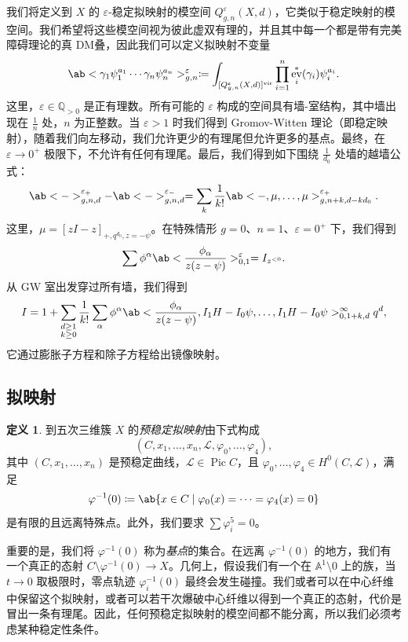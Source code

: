 \documentclass{amsart}
\theoremstyle{definition}
\newtheorem{defn}[thm]{定义}
\theoremstyle{remark}
\theoremstyle{plain}
\theoremstyle{definition}
\theoremstyle{remark}
\newcommand{\A}{\mathbb{A}}
\newcommand{\Q}{\mathbb{Q}}
\newcommand{\ep}{\varepsilon}
\newcommand{\mc}[1]{\mathcal{#1}}
\newcommand{\mr}[1]{\mathrm{#1}}
\newcommand{\1}{\mathbf{1}}
\newcommand{\2}{\mathbf{2}}
\newcommand{\3}{\mathbf{3}}
\newcommand{\vir}{\mr{vir}}
\DeclareMathOperator{\Pic}{Pic}
\DeclareMathOperator{\ev}{ev}
\begin{document}
我们将定义到 \(X\) 的 \(\ep\)-稳定拟映射的模空间 \(Q_{g,n}^{\ep}(X, d)\)，它类似于稳定映射的模空间。我们希望将这些模空间视为彼此虚双有理的，并且其中每一个都是带有完美障碍理论的真 DM叠，因此我们可以定义拟映射不变量
\[ \ab< \gamma_1 \psi_1^{a_1} \cdots \gamma_n \psi_n^{a_n}>_{g,n}^{\ep} \coloneqq \int_{[Q_{g,n}^{\ep}(X,d)]^{\vir}} \prod_{i=1}^n \ev_i^*(\gamma_i) \psi_i^{a_i}. \]
这里，\(\ep \in \Q_{>0}\) 是正有理数。所有可能的 \(\ep\) 构成的空间具有墙-室结构，其中墙出现在 \(\frac{1}{n}\) 处，\(n\) 为正整数。当 \(\ep > 1\) 时我们得到 Gromov-Witten 理论（即稳定映射），随着我们向左移动，我们允许更少的有理尾但允许更多的基点。最终，在 \(\ep \to 0^+\) 极限下，不允许有任何有理尾。最后，我们得到如下围绕 \(\frac{1}{d_0}\) 处墙的越墙公式：
\[ \ab<->_{g,n,d}^{\ep_+} - \ab<->_{g,n,d}^{\ep_-} = \sum_{k} \frac{1}{k!} \ab<-, \mu, \ldots, \mu>_{g,n+k, d-kd_0}^{\ep_+}. \]
这里，\(\mu = [zI-z]_{+, q^{d_0}, z=-\psi}\)。在特殊情形 \(g = 0\)、\(n = 1\)、\(\ep = 0^+\) 下，我们得到
\[ \sum \phi^{\alpha} \ab<\frac{\phi_{\alpha}}{z(z-\psi)}>^{\ep}_{0,1} = I_{z^{<0}}. \]
从 GW 室出发穿过所有墙，我们得到
\[ I = 1 + \sum_{\substack{d \geq 1 \\ k \geq 0}} \frac{1}{k!} \sum_{\alpha} \phi^{\alpha} \ab< \frac{\phi_{\alpha}}{z(z-\psi)}, I_1 H - I_0 \psi, \ldots, I_1 H - I_0 \psi>_{0,1+k,d}^{\infty} q^d, \]
它通过膨胀子方程和除子方程给出镜像映射。

\subsection{拟映射}%
\label{sub:Quasimaps}

\begin{defn}
    到五次三维簇 \(X\) 的\textit{预稳定拟映射}由下式构成
    \[(C, x_1, \ldots, x_n, \mc{L}, \varphi_0, \ldots, \varphi_4),\] 
    其中 \((C, x_1, \ldots, x_n)\) 是预稳定曲线，\(\mc{L} \in \Pic C\)，且 \(\varphi_0, \ldots, \varphi_4 \in H^0(C, \mc{L})\)，满足
    \[ \varphi^{-1}(0) \coloneqq \ab\{x \in C \mid \varphi_0(x) = \cdots = \varphi_4(x) = 0 \} \]
    是有限的且远离特殊点。此外，我们要求 \(\sum \varphi_i^5 = 0\)。
\end{defn}

重要的是，我们将 \(\varphi^{-1}(0)\) 称为\textit{基点}的集合。在远离 \(\varphi^{-1}(0)\) 的地方，我们有一个真正的态射 \(C \setminus \varphi^{-1}(0) \to X\)。几何上，假设我们有一个在 \(\A^1 \setminus 0\) 上的族，当 \(t \to 0\) 取极限时，零点轨迹 \(\varphi_i^{-1}(0)\) 最终会发生碰撞。我们或者可以在中心纤维中保留这个拟映射，或者可以若干次爆破中心纤维以得到一个真正的态射，代价是冒出一条有理尾。因此，任何预稳定拟映射的模空间都不能分离，所以我们必须考虑某种稳定性条件。
\end{document}
